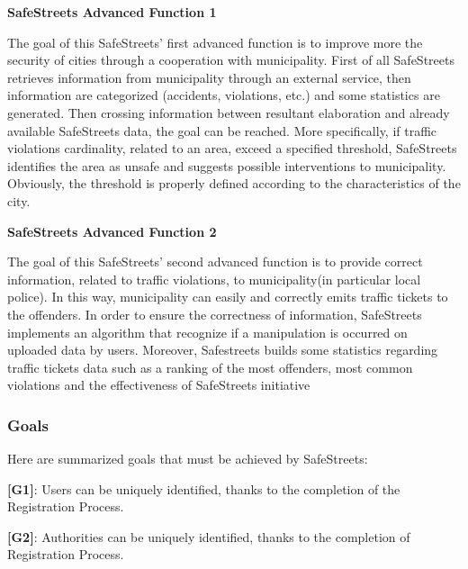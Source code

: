 \documentclass[12pt]{article}
\begin{document}
\begin{flushleft}
\textbf{SafeStreets Advanced Function 1}
\end{flushleft}
\vspace{3mm}
The goal of this SafeStreets’ first advanced function is to improve more the security of cities through a cooperation with municipality. First of all SafeStreets retrieves information from municipality through an external service, then information are categorized (accidents, violations, etc.) and some statistics are generated. Then crossing information between resultant elaboration and already available SafeStreets data, the goal can be reached. More specifically, if traffic violations cardinality, related to an area, exceed a specified threshold, SafeStreets identifies the area as unsafe and suggests possible interventions to municipality. Obviously, the threshold is properly defined according to the characteristics of the city.

\newpage

\begin{flushleft}
\textbf{SafeStreets Advanced Function 2}
\end{flushleft}
\vspace{3mm}
The goal of this SafeStreets’ second advanced function is to provide correct information, related to traffic violations, to municipality(in particular local police). In this way, municipality can easily and correctly emits traffic tickets to the offenders. In order to ensure the correctness of information, SafeStreets implements an algorithm that recognize if a manipulation is occurred on uploaded data by users. Moreover, Safestreets builds some statistics regarding traffic tickets data such as a ranking of the most offenders, most common violations and the effectiveness of SafeStreets initiative
\vspace{4mm}

\subsubsection{Goals} %

\vspace{5mm}
Here are summarized goals that must be achieved by SafeStreets:
\vspace{2mm}

\textbf{[G1]}: Users can be uniquely identified, thanks to the completion of the Registration Process.\vspace{1mm}

\textbf{[G2]}: Authorities can be uniquely identified, thanks to the completion of Registration Process.
\vspace{1mm}
\end{document}
